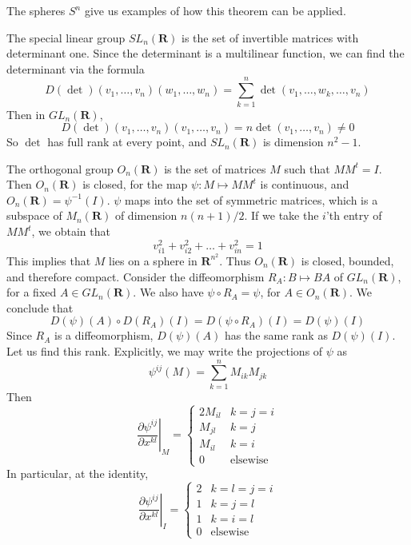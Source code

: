 The spheres $S^n$ give us examples of how this theorem can be applied.

\begin{example}
    The special linear group $SL_n(\mathbf{R})$ is the set of invertible matrices with determinant one. Since the determinant is a multilinear function, we can find the determinant via the formula
    \[ D(\det)(v_1, \dots, v_n)(w_1, \dots, w_n) = \sum_{k = 1}^n \det(v_1, \dots, w_k, \dots, v_n) \]
    Then in $GL_n(\mathbf{R})$,
    \[ D(\det)(v_1, \dots, v_n)(v_1, \dots, v_n) = n \det(v_1, \dots, v_n) \neq 0 \]
    So $\det$ has full rank at every point, and $SL_n(\mathbf{R})$ is dimension $n^2 - 1$.
\end{example}

\begin{example}
    The orthogonal group $O_n(\mathbf{R})$ is the set of matrices $M$ such that $MM^t = I$. Then $O_n(\mathbf{R})$ is closed, for the map $\psi: M \mapsto MM^t$ is continuous, and $O_n(\mathbf{R}) = \psi^{-1}(I)$. $\psi$ maps into the set of symmetric matrices, which is a subspace of $M_n(\mathbf{R})$ of dimension $n(n+1)/2$. If we take the $i$'th entry of $MM^t$, we obtain that
    \[ v_{i1}^2 + v_{i2}^2 + \dots + v_{in}^2 = 1 \]
    This implies that $M$ lies on a sphere in $\mathbf{R}^{n^2}$. Thus $O_n(\mathbf{R})$ is closed, bounded, and therefore compact. Consider the diffeomorphism $R_A: B \mapsto BA$ of $GL_n(\mathbf{R})$, for a fixed $A \in GL_n(\mathbf{R})$. We also have $\psi \circ R_A = \psi$, for $A \in O_n(\mathbf{R})$. We conclude that
    \[ D(\psi)(A) \circ D(R_A)(I) = D(\psi \circ R_A)(I) = D(\psi)(I) \]
    Since $R_A$ is a diffeomorphism, $D(\psi)(A)$ has the same rank as $D(\psi)(I)$. Let us find this rank. Explicitly, we may write the projections of $\psi$ as
    \[ \psi^{ij}(M) = \sum_{k = 1}^n M_{ik}M_{jk} \]
    Then
    \[ \left.\frac{\partial \psi^{ij}}{\partial x^{kl}}\right|_M = \begin{cases} 2 M_{il} & k = j = i \\ M_{jl} & k = j \\ M_{il} & k = i \\ 0 & \text{elsewise} \end{cases} \]
    In particular, at the identity,
    \[ \left.\frac{\partial \psi^{ij}}{\partial x^{kl}}\right|_I = \begin{cases} 2 & k = l = j = i \\ 1 & k = j = l \\ 1 & k = i = l \\ 0 & \text{elsewise} \end{cases} \]

\end{example}
